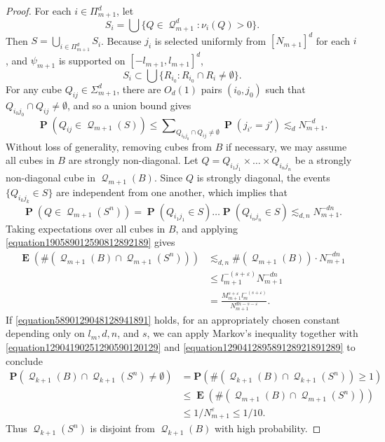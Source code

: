 \documentclass[12pt,reqno]{amsart}
\DeclareMathOperator{\EE}{\mathbf{E}}
\DeclareMathOperator{\PP}{\mathbf{P}}
\DeclareMathOperator{\DQ}{\mathcal{Q}}
\begin{document}
\begin{proof}
	For each $i \in \Pi_{m+1}^d$, let
	\[ S_i = \bigcup \{ Q \in \DQ_{m+1}^d: \nu_i(Q) > 0 \}. \]
	Then $S = \bigcup_{i \in \Pi_{m+1}^d} S_i$. Because $j_i$ is selected uniformly from $[N_{m+1}]^d$ for each $i$, and $\psi_{m+1}$ is supported on $[-l_{m+1},l_{m+1}]^d$,
	\[ S_i \subset \bigcup \{ R_{i_0} : R_{i_0} \cap R_i \neq \emptyset \}. \]
	For any cube $Q_{ij} \in \Sigma_{m+1}^d$, there are $O_d(1)$ pairs $(i_0,j_0)$ such that $Q_{i_0j_0} \cap Q_{ij} \neq \emptyset$, and so a union bound gives
	\[ \PP(Q_{ij} \in \DQ_{m+1}(S)) \leq \sum\nolimits_{Q_{i_0j_0} \cap Q_{ij} \neq \emptyset} \PP(j_{i'} = j') \lesssim_d N_{m+1}^{-d}. \]
	Without loss of generality, removing cubes from $B$ if necessary, we may assume all cubes in $B$ are strongly non-diagonal. Let $Q = Q_{i_1j_1} \times \dots \times Q_{i_nj_n}$ be a strongly non-diagonal cube in $\DQ_{m+1}(B)$. Since $Q$ is strongly diagonal, the events $\{ Q_{i_kj_k} \in S \}$ are independent from one another, which implies that
    \begin{equation} \label{equation190589012590812892189}
	   \PP(Q \in \DQ_{m+1}(S^n)) = \PP(Q_{i_1j_1} \in S) \dots \PP(Q_{i_nj_n} \in S) \lesssim_{d,n} N_{m+1}^{-dn}.
    \end{equation}
	Taking expectations over all cubes in $B$, and applying \eqref{equation190589012590812892189} gives
    \begin{equation} \label{equation129041289589128921891289}
	\begin{split}
		\EE(\#(\DQ_{m+1}(B) \cap \DQ_{m+1}(S^n))) &\lesssim_{d,n} \#(\DQ_{m+1}(B)) \cdot N_{m+1}^{-dn}\\
		&\leq l_{m+1}^{-(s + \varepsilon)} N_{m+1}^{- dn}\\
		&= \frac{M_{m+1}^{s + \varepsilon} l_m^{-(s + \varepsilon)}}{N_{m+1}^{dn - s - \varepsilon}}.
	\end{split}
    \end{equation}
    If \eqref{equation5890129048128941891} holds, for an appropriately chosen constant depending only on $l_m, d, n$, and $s$, we can apply Markov's inequality together with \eqref{equation12904190251290590120129} and \eqref{equation129041289589128921891289} to conclude
    \begin{equation} \label{fourierdim2}
    \begin{split}
        \mathbf{P}(\DQ_{k+1}(B) \cap \DQ_{k+1}(S^n) \neq \emptyset) &= \mathbf{P}(\# (\DQ_{k+1}(B) \cap \DQ_{k+1}(S^n)) \geq 1)\\
        &\leq \EE(\#(\DQ_{m+1}(B) \cap \DQ_{m+1}(S^n)))\\
        &\leq 1/N_{m+1}^\varepsilon \leq 1/10.
    \end{split}
    \end{equation}
    Thus $\DQ_{k+1}(S^n)$ is disjoint from $\DQ_{k+1}(B)$ with high probability.


\end{proof}
\end{document}

